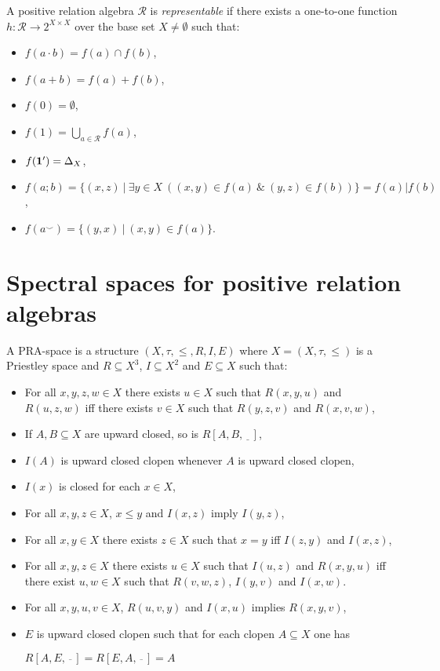 \documentclass[a4paper]{article}
\theoremstyle{defin}
\theoremstyle{theorem}
\theoremstyle{claim}
\theoremstyle{prop}
\theoremstyle{lemma}
\theoremstyle{fact}
\theoremstyle{ex}
\theoremstyle{col}
\begin{document}
A positive relation algebra $\mathcal{R}$ is \emph{representable} if there exists a one-to-one function $h : \mathcal{R} \to 2^{X \times X}$ over the base set $X \neq \emptyset$ such that:
\begin{itemize}
\item $f(a \cdot b) = f(a) \cap f(b)$,
\item $f(a + b) = f(a) + f(b)$,
\item $f(0) = \emptyset$,
\item $f(1) = \bigcup \limits_{a \in \mathcal{R}} f(a)$,
\item $f({\bf 1}') = \Delta_X$,
\item $f(a ; b) = \{ (x, z) \: | \: \exists y \in X \: ((x, y) \in f(a) \: \& \: (y,z) \in f(b))\} = f(a) | f(b)$,
\item $f(a^{\smile}) = \{ (y, x) \: | \: (x, y) \in f(a) \}$.
\end{itemize}

\section{Spectral spaces for positive relation algebras}

A PRA-space is a structure $(X, \tau, \leq, R, I, E)$ where $X = (X, \tau, \leq)$ is a Priestley space and $R \subseteq X^3$, $I \subseteq X^2$ and $E \subseteq X$ such that:
\begin{itemize}
\item For all $x, y, z, w \in X$ there exists $u \in X$ such that $R(x, y, u)$ and $R(u, z, w)$ iff there exists $v \in X$ such that $R(y,z,v)$ and $R(x, v, w)$,
\item If $A, B \subseteq X$ are upward closed, so is $R[A, B, \underline{\:\:\:}]$,
\item $I(A)$ is upward closed clopen whenever $A$ is upward closed clopen,
\item $I(x)$ is closed for each $x \in X$,
\item For all $x, y, z \in X$, $x \leq y$ and $I(x, z)$ imply $I(y, z)$,
\item For all $x, y \in X$ there exists $z \in X$ such that $x = y$ iff $I(z, y)$ and $I(x, z)$,
\item For all $x, y, z \in X$ there exists $u \in X$ such that $I(u, z)$ and $R(x, y, u)$ iff there exist $u, w \in X$ such that $R(v, w, z)$, $I(y,v)$ and $I(x, w)$.
\item For all $x,y,u, v \in X$, $R(u,v,y)$ and $I(x, u)$ implies $R(x,y,v)$,
\item $E$ is upward closed clopen such that for each clopen $A \subseteq X$ one has
\begin{center}
$R[A, E, \overline{\:\:\:}] = R[E, A, \overline{\:\:\:}] = A$
\end{center}
\end{itemize}
\end{document}
